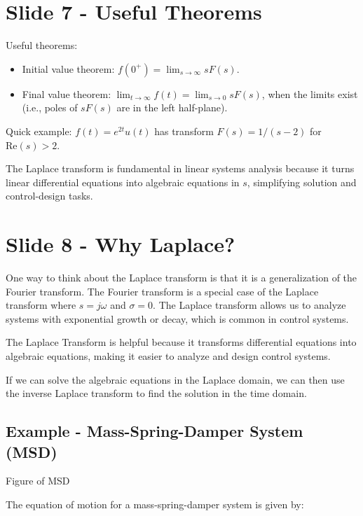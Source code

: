\documentclass[
  letterpaper,
  DIV=11,
  numbers=noendperiod]{scrreprt}
\providecommand{\tightlist}{%
  \setlength{\itemsep}{0pt}\setlength{\parskip}{0pt}}
\begin{document}
\section{Slide 7 - Useful Theorems}\label{slide-7---useful-theorems}

Useful theorems:

\begin{itemize}
\tightlist
\item
  Initial value theorem: \(f(0^+)=\lim_{s\to\infty} sF(s)\).
\item
  Final value theorem: \(\lim_{t\to\infty} f(t)=\lim_{s\to0} sF(s)\),
  when the limits exist (i.e., poles of \(sF(s)\) are in the left
  half-plane).
\end{itemize}

Quick example: \(f(t)=e^{2t}u(t)\) has transform \(F(s)=1/(s-2)\) for
\(\mathrm{Re}(s)>2\).

The Laplace transform is fundamental in linear systems analysis because
it turns linear differential equations into algebraic equations in
\(s\), simplifying solution and control-design tasks.

\section{Slide 8 - Why Laplace?}\label{slide-8---why-laplace}

One way to think about the Laplace transform is that it is a
generalization of the Fourier transform. The Fourier transform is a
special case of the Laplace transform where \(s=j\omega\) and
\(\sigma=0\). The Laplace transform allows us to analyze systems with
exponential growth or decay, which is common in control systems.

The Laplace Transform is helpful because it transforms differential
equations into algebraic equations, making it easier to analyze and
design control systems.

If we can solve the algebraic equations in the Laplace domain, we can
then use the inverse Laplace transform to find the solution in the time
domain.

\subsection{Example - Mass-Spring-Damper System
(MSD)}\label{example---mass-spring-damper-system-msd}

Figure of MSD

The equation of motion for a mass-spring-damper system is given by:
\end{document}
